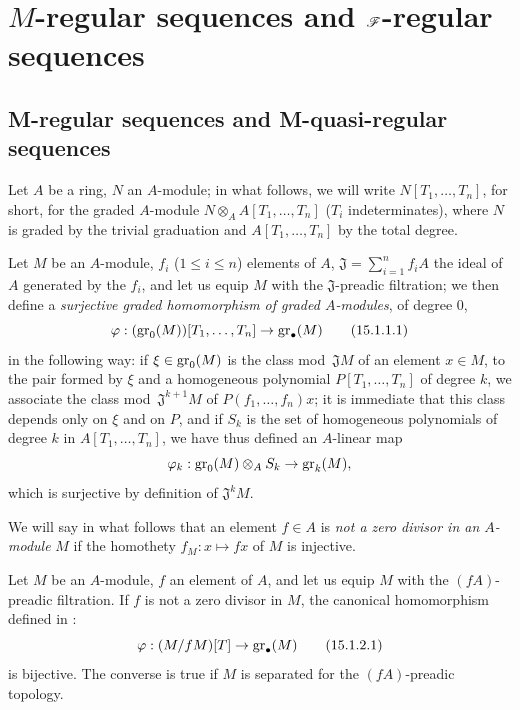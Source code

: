 \section{\texorpdfstring{$M$}{M}-regular sequences and \texorpdfstring{$\mathscr{F}$}{F}-regular sequences}
\label{section:0.15}

\subsection{M-regular sequences and M-quasi-regular sequences}
\label{subsection:0.15.1}
\label{0.15.1}

\begin{env}[15.1.1]
\label{0.15.1.1}
Let $A$ be a ring, $N$ an $A$-module;
in what follows, we will write $N[T_1,\ldots,T_n]$, for short, for the graded $A$-module $N\otimes_A A[T_1,\ldots,T_n]$ ($T_i$ indeterminates), where $N$ is graded by the trivial graduation and $A[T_1,\ldots,T_n]$ by the total degree.

Let $M$ be an $A$-module, $f_i$ ($1\leq i\leq n$) elements of $A$, $\mathfrak{J}=\sum_{i=1}^n f_iA$ the ideal of $A$ generated by the $f_i$, and let us equip $M$ with the $\mathfrak{J}$-preadic filtration;
we then define a \emph{surjective graded homomorphism of graded $A$-modules}, of degree $0$,
\[
\label{0.15.1.1.1}
  \varphi : (\operatorname{gr}_0(M))[T_1,\ldots,T_n] \to \operatorname{gr}_\bullet(M)
\tag{15.1.1.1}
\]
in the following way:
if $\xi\in\operatorname{gr}_0(M)$ is the class mod~$\mathfrak{J}M$ of an element $x\in M$, to the pair formed by $\xi$ and a homogeneous polynomial $P[T_1,\ldots,T_n]$ of degree $k$, we associate the class mod~$\mathfrak{J}^{k+1}M$ of $P(f_1,\ldots,f_n)x$;
it is immediate that this class depends only on $\xi$ and on $P$, and if $S_k$ is the set of homogeneous polynomials of degree $k$ in $A[T_1,\ldots,T_n]$, we have thus defined an $A$-linear map
\[
  \varphi_k : \operatorname{gr}_0(M)\otimes_A S_k \to \operatorname{gr}_k(M),
\]
which is surjective by definition of $\mathfrak{J}^k M$.

We will say in what follows that an element $f\in A$ is \emph{not a zero divisor in an $A$-module} $M$ if the homothety $f_M:x\mapsto fx$ of $M$ is injective.
\end{env}

\begin{lemma}[15.1.2]
\label{0.15.1.2}
Let $M$ be an $A$-module, $f$ an element of $A$, and let us equip $M$ with the $(fA)$-preadic filtration.
If $f$ is not a zero divisor in $M$, the canonical homomorphism defined in :
\[
\label{0.15.1.2.1}
  \varphi : (M/fM)[T] \to \operatorname{gr}_\bullet(M)
\tag{15.1.2.1}
\]
is bijective.
The converse is true if $M$ is separated for the $(fA)$-preadic topology.
\end{lemma}

